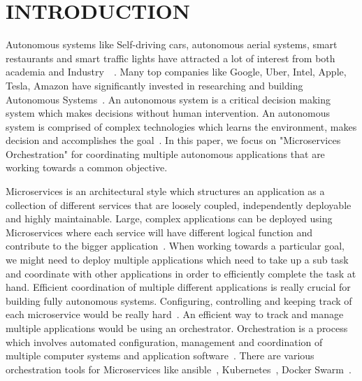 \section{INTRODUCTION}




Autonomous systems like Self-driving cars, autonomous aerial systems, smart restaurants and smart traffic lights have attracted a lot of interest from both academia and Industry~\cite{transportresearch}~\cite{boubin2019managingdeprecated}. Many top companies like Google, Uber, Intel, Apple, Tesla, Amazon have significantly invested in researching and building Autonomous Systems~\cite{selfdriving}. An autonomous system is a critical decision making system which makes decisions without human intervention. An autonomous system is comprised of complex technologies which learns the environment, makes decision and accomplishes the goal~\cite{transportresearch}. In this paper, we focus on "Microservices Orchestration" for coordinating multiple autonomous applications that are working towards a common objective.
 
Microservices is an architectural style which structures an application as a collection of different services that are loosely coupled, independently deployable and highly maintainable. Large, complex applications can be deployed using Microservices where each service will have different logical function and contribute to the bigger application~\cite{micro_article}. %
When working towards a particular goal, we might need to deploy multiple applications which need to take up a sub task and coordinate with other applications in order to efficiently complete the task at hand. Efficient coordination of multiple different applications is really crucial for building fully autonomous systems.%
Configuring, controlling and keeping track of each microservice would be really hard~\cite{orchestrate}. An efficient way to track and manage multiple applications would be using an orchestrator.  Orchestration is a process which involves automated configuration, management and coordination of multiple computer systems and application software~\cite{it_orchestrate}. There are various orchestration tools for Microservices like ansible~\cite{ansible}, Kubernetes~\cite{kubernetes}, Docker Swarm~\cite{swarm_docker}. 

